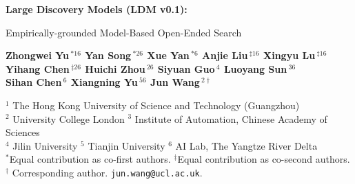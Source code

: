 \documentclass[11pt]{article}
\theoremstyle{plain}
\theoremstyle{definition}
\theoremstyle{remark}
\begin{document}

\begin{tcolorbox}[
    enhanced,
    breakable,
    colframe=ldmedge,
    boxrule=0.45pt,
    arc=12pt,
    left=14pt,
    right=14pt,
    top=14pt,
    bottom=13pt,
    before skip=0pt,
    after skip=15pt,
    interior style={
      shade,
      shading angle=315,
      left color=white!97!ldmbg,
      right color=ldmred!7!ldmbg
    }
]
    {
    \centering
    {\color{ldmdarkred}\sffamily\bfseries
      {\LARGE Large Discovery Models (LDM v0.1):}\par
    
      \vspace{4pt}
    
      {\Large
        Empirically-grounded Model-Based Open-Ended Search}\par
    }
    
    \vspace{11pt}
    
    {\color{ldmtext}\sffamily
      {\large\bfseries
        Zhongwei Yu\,$^{*16}$\quad
        Yan Song\,$^{*26}$\quad
        Xue Yan\,$^{*6}$\quad
        Anjie Liu\,$^{\ddagger16}$\quad
        Xingyu Lu\,$^{\ddagger16}$\quad \\
        Yihang Chen\,$^{\ddagger26}$\quad 
        Huichi Zhou\,$^{26}$\quad
        Siyuan Guo\,$^{4}$\quad 
        Luoyang Sun\,$^{36}$\quad
        \\
        Sihan Chen\,$^{6}$\quad
        Xiangning Yu\,$^{56}$\quad
        Jun Wang\,$^{2\dagger}$
      }\par
    
      \vspace{6pt}
    
      {\small
        $^{1}$ The Hong Kong University of Science and Technology (Guangzhou)\\
        $^{2}$ University College London\quad 
        $^{3}$ Institute of Automation, Chinese Academy of Sciences\\
        $^{4}$ Jilin University\quad
        $^{5}$ Tianjin University\quad
        $^{6}$ AI Lab, The Yangtze River Delta\\
        $^{*}$Equal contribution as co-first authors. \quad
        $^{\ddagger}$Equal contribution as co-second authors.\\
        $^\dagger$ Corresponding author. \texttt{jun.wang@ucl.ac.uk}.
      }\par
    }
    }
    

\end{tcolorbox}
\end{document}
